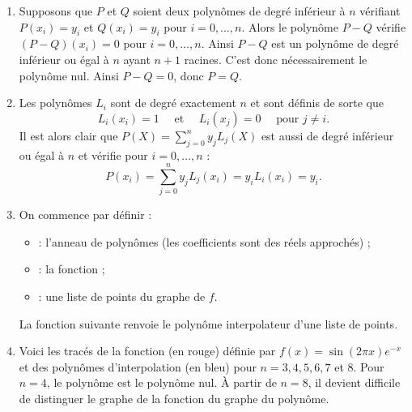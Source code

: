 \documentclass[class=report,crop=false]{standalone}
\begin{document}
\begin{enumerate}
  \item Supposons que $P$ et $Q$ soient deux polynômes de degré inférieur à $n$ vérifiant
  $P(x_i)=y_i$ et $Q(x_i)=y_i$ pour $i=0,\ldots,n$. Alors le polynôme $P-Q$ vérifie
  $(P-Q)(x_i)=0$ pour $i=0,\ldots,n$. Ainsi $P-Q$ est un polynôme de degré inférieur ou égal à $n$ 
  ayant $n+1$ racines. %
  C'est donc nécessairement le polynôme nul.
  Ainsi $P-Q=0$, donc $P=Q$.
  
  \item Les polynômes $L_i$ sont de degré exactement $n$ et sont définis de sorte que
  $$L_i(x_i) = 1 \quad \text{ et } \quad L_i(x_j)=0 \quad\text{ pour } j\neq i.$$
  Il est alors clair que $P(X) = \sum_{j=0}^{n} y_j L_j(X)$
  est aussi de degré inférieur ou égal à $n$ et vérifie pour  $i=0,\ldots,n$ : 
  $$P(x_i)=  \sum_{j=0}^{n} y_j L_j(x_i) = y_iL_i(x_i) = y_i.$$
  
   
  \item On commence par définir :
  \begin{itemize}
    \item {} : l'anneau de polynômes (les coefficients sont des réels approchés) ;
    \item {} : la fonction ;
    \item {} : une liste de points
    du graphe de $f$.
  \end{itemize}

  La fonction suivante renvoie le polynôme interpolateur d'une liste de points.
  
  
  \item Voici les tracés de la fonction (en rouge) définie par $f(x) = \sin(2\pi x)e^{-x}$ 
    et des polynômes d'interpolation (en bleu) pour $n=3,4,5,6,7$ et $8$.
    Pour $n=4$, le polynôme est le polynôme nul. À partir de $n=8$, il devient difficile de distinguer le
    graphe de la fonction du graphe du polynôme.
  

\end{enumerate}
\end{document}
